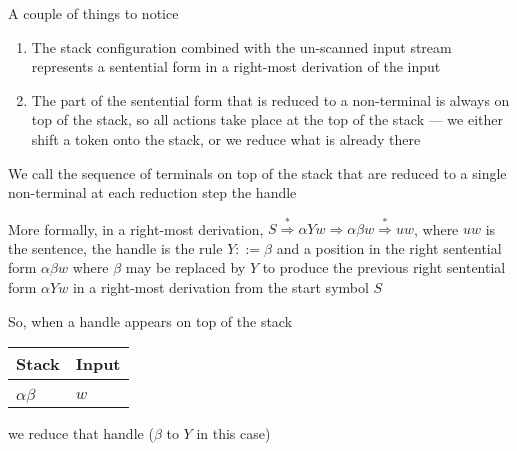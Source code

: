 \documentclass[8pt,a4paper,compress]{beamer}
\newcommand{\derives}{\stackrel{*}{\Rightarrow}}
\begin{document}
\begin{frame}[fragile]
\pause

A couple of things to notice
\begin{enumerate}
\item The stack configuration combined with the un-scanned input stream represents a sentential form in a right-most derivation of the input

\item The part of the sentential form that is reduced to a non-terminal is always on top of the stack, so all actions take place at the top of the stack --- we either shift a token onto the stack, or we reduce what is already there
\end{enumerate}

\pause
\bigskip

We call the sequence of terminals on top of the stack that are reduced to a single non-terminal at each reduction step the handle

\pause
\bigskip

More formally, in a right-most derivation, $S \derives\alpha Yw \Rightarrow \alpha \beta w \derives uw$, where $uw$ is the sentence, the handle is the rule $Y ::= \beta$ and a position in the right sentential form $\alpha \beta w$ where $\beta$ may be replaced by $Y$ to produce the previous right sentential form $\alpha Yw$ in a right-most derivation from the start symbol $S$

\pause
\bigskip

So, when a handle appears on top of the stack

\begin{table}[H]
\begin{tabular}{ll}
Stack & Input \\ \hline \\
$\alpha \beta$ & $w$
\end{tabular}
\end{table}
\noindent we reduce that handle ($\beta$ to $Y$ in this case)
\end{frame}
\end{document}
